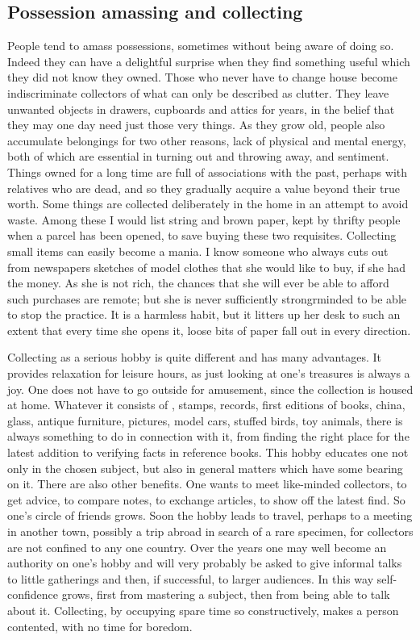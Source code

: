 \documentclass[11pt]{article}
\begin{document}
\subsection{Possession amassing and collecting}
\label{sec-1-59}

People tend to amass possessions, sometimes without being aware of doing so. Indeed they can have a delightful surprise when they find something useful which they did not know they owned. Those who never have to change house become indiscriminate collectors of what can only be described as clutter. They leave unwanted objects in drawers, cupboards and attics for years, in the belief that they may one day need just those very things. As they grow old, people also accumulate belongings for two other reasons, lack of physical and mental energy, both of which are essential in turning out and throwing away, and sentiment. Things owned for a long time are full of associations with the past, perhaps with relatives who are dead, and so they gradually acquire a value beyond their true worth. Some things are collected deliberately in the home in an attempt to avoid waste. Among these I would list string and brown paper, kept by thrifty people when a parcel has been opened, to save buying these two requisites. Collecting small items can easily become a mania. I know someone who always cuts out from newspapers sketches of model clothes that she would like to buy, if she had the money. As she is not rich, the chances that she will ever be able to afford such purchases are remote; but she is never sufficiently strongrminded to be able to stop the practice. It is a harmless habit, but it litters up her desk to such an extent that every time she opens it, loose bits of paper fall out in every direction.

Collecting as a serious hobby is quite different and has many advantages. It provides relaxation for leisure hours, as just looking at one's treasures is always a joy. One does not have to go outside for amusement, since the collection is housed at home. Whatever it consists of , stamps, records, first editions of books, china, glass, antique furniture, pictures, model cars, stuffed birds, toy animals, there is always something to do in connection with it, from finding the right place for the latest addition to verifying facts in reference books. This hobby educates one not only in the chosen subject, but also in general matters which have some bearing on it. There are also other benefits. One wants to meet like-minded collectors, to get advice, to compare notes, to exchange articles, to show off the latest find. So one's circle of friends grows. Soon the hobby leads to travel, perhaps to a meeting in another town, possibly a trip abroad in search of a rare specimen, for collectors are not confined to any one country. Over the years one may well become an authority on one's hobby and will very probably be asked to give informal talks to little gatherings and then, if successful, to larger audiences. In this way self-confidence grows, first from mastering a subject, then from being able to talk about it. Collecting, by occupying spare time so constructively, makes a person contented, with no time for boredom. 
\end{document}
